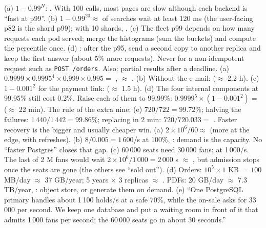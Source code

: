  (a) $1 - 0.99^N$: . With 100 calls, most pages are slow although each backend is ``fast at p99''. (b) $1 - 0.99^{20} \approx$  of searches wait at least 120 ms (the user-facing p82 is the shard p99); with 10 shards, . (c)  The fleet p99 depends on how many requests each pod served; merge the histograms (sum the buckets) and compute the percentile once. (d) : after the p95, send a second copy to another replica and keep the first answer (about 5\% more requests). Never for a non-idempotent request such as \texttt{POST /orders}. Also: partial results after a deadline.
 (a) $0.9999 \times 0.9995^4 \times 0.999 \times 0.995 =$ , $\approx$ . (b) Without the e-mail:  ($\approx$ 2.2 h). (c) $1 - 0.001^2$ for the payment link:  ($\approx$ 1.5 h). (d) The four internal components at 99.95\% still cost 0.2\%. Raise each of them to 99.99\%: $0.9999^5 \times (1 - 0.001^2) =$  ($\approx$ 22 min). The rule of the extra nine:  (e) $720/722 = 99.72\%$; halving the failures: $1\,440/1\,442 = 99.86\%$; replacing in 2 min: $720/720.033 =$ . Faster recovery is the bigger and usually cheaper win.
 (a) $2 \times 10^6 / 60 \approx$  (more at the edge, with refreshes). (b) $8/0.005 = 1\,600$/s at 100\%, : demand is  the capacity. No ``faster Postgres'' closes that gap. (c) 60\,000 seats need 30\,000 fans:  at 1\,000/s. The last of 2 M fans would wait $2 \times 10^6 / 1\,000 = 2\,000$ s $\approx$ , but admission stops once the seats are gone (the others see ``sold out''). (d) Orders: $10^5 \times 1$ KB $= 100$ MB/day $\approx$ 37 GB/year; 5 years $\times$ 3 replicas $\approx$ . PDFs: 20 GB/day $\approx$ 7.3 TB/year, : object store, or generate them on demand. (e) ``One PostgreSQL primary handles about 1\,100 holds/s at a safe 70\%, while the on-sale asks for 33\,000 per second. We keep one database and put a waiting room in front of it that admits 1\,000 fans per second; the 60\,000 seats go in about 30 seconds.''
